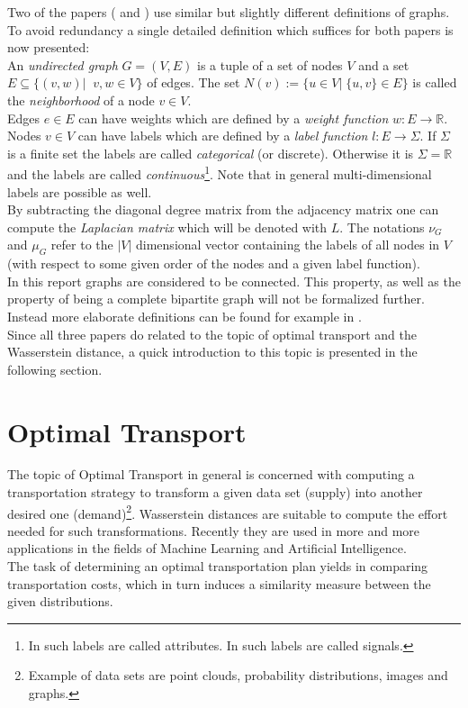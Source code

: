 \documentclass[twoside]{scrartcl}
\newcommand{\IR}{\mathbb{R}}
\begin{document}
Two of the papers (\cite{A} and \cite{B}) use similar but slightly different definitions of graphs. To avoid redundancy a single detailed definition which suffices for both papers is now presented:\\
An \textit{undirected graph} $G=(V,E)$ is a tuple of a set of nodes $V$ and a set $E\subseteq \{ (v,w)|\;\; v,w\in V \}$ of edges. The set $N(v):= \{ u\in V|\; \{u,v\}\in E \}$ is called the \textit{neighborhood} of a node $v\in V$.\\
Edges $e\in E$ can have weights which are defined by a \textit{weight function} $w:E\to \IR$. 
Nodes $v\in V$ can have labels which are defined by a \textit{label function} $l:E\to \Sigma$. If $\Sigma$ is a finite set the labels are called \textit{categorical} (or discrete). Otherwise it is $\Sigma=\IR$ and the labels are called \textit{continuous}\footnote{In \cite{A} such labels are called attributes. In \cite{B} such labels are called signals.}. Note that in general multi-dimensional labels are possible as well.\\
By subtracting the diagonal degree matrix from the adjacency matrix one can compute the \textit{Laplacian matrix} which will be denoted with $L$. The notations $\nu_G$ and $\mu_G$ refer to the $|V|$ dimensional vector containing the labels of all nodes in $V$ (with respect to some given order of the nodes and a given label function).\\

In this report graphs are considered to be connected. This property, as well as the property of being a complete bipartite graph will not be formalized further. Instead more elaborate definitions can be found for example in \cite{discreteBible}.\\

Since all three papers do related to the topic of optimal transport and the Wasserstein distance, a quick introduction to this topic is presented in the following section. 


\section{Optimal Transport}

The topic of Optimal Transport in general is concerned with computing a transportation strategy to transform a given data set (supply) into another desired one (demand)\footnote{Example of data sets are point clouds, probability distributions, images and graphs.}. Wasserstein distances are suitable to compute the effort needed for such transformations. Recently they are used in more and more applications in the fields of Machine Learning and Artificial Intelligence.\\
The task of determining an optimal transportation plan yields in comparing transportation costs, which in turn induces a similarity measure between the given distributions.\\
\end{document}
